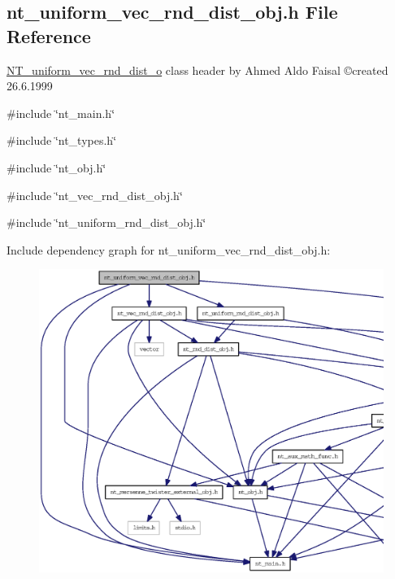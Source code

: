\subsection{nt\_\-uniform\_\-vec\_\-rnd\_\-dist\_\-obj.h File Reference}
\label{nt__uniform__vec__rnd__dist__obj_8h}



\begin{DoxyItemize}
\item \hyperlink{class_n_t__uniform__vec__rnd__dist__o}{NT\_\-uniform\_\-vec\_\-rnd\_\-dist\_\-o} class header by Ahmed Aldo Faisal \copyright created 26.6.1999 
\end{DoxyItemize} 


{\ttfamily \#include \char`\"{}nt\_\-main.h\char`\"{}}\par
{\ttfamily \#include \char`\"{}nt\_\-types.h\char`\"{}}\par
{\ttfamily \#include \char`\"{}nt\_\-obj.h\char`\"{}}\par
{\ttfamily \#include \char`\"{}nt\_\-vec\_\-rnd\_\-dist\_\-obj.h\char`\"{}}\par
{\ttfamily \#include \char`\"{}nt\_\-uniform\_\-rnd\_\-dist\_\-obj.h\char`\"{}}\par
Include dependency graph for nt\_\-uniform\_\-vec\_\-rnd\_\-dist\_\-obj.h:
\nopagebreak
\begin{figure}[H]
\begin{center}
\leavevmode
\includegraphics[width=400pt]{nt__uniform__vec__rnd__dist__obj_8h__incl}
\end{center}
\end{figure}
